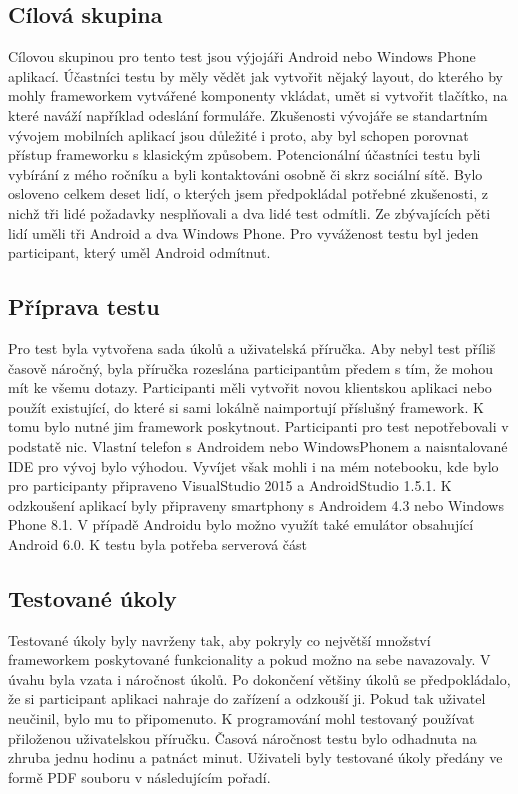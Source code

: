 \subsection{Cílová skupina}
Cílovou skupinou pro tento test jsou výjojáři Android nebo Windows Phone aplikací. Účastníci testu by měly vědět jak vytvořit nějaký layout, do kterého by mohly frameworkem vytvářené komponenty vkládat, umět si vytvořit tlačítko, na které naváží například odeslání formuláře. Zkušenosti vývojáře se standartním vývojem mobilních aplikací jsou důležité i proto, aby byl schopen porovnat přístup frameworku s klasickým způsobem. Potencionální účastníci testu byli vybírání z mého ročníku a byli kontaktováni osobně či skrz sociální sítě. Bylo osloveno celkem deset lidí, o kterých jsem předpokládal potřebné zkušenosti, z nichž tři lidé požadavky nesplňovali a dva lidé test odmítli. Ze zbývajících pěti lidí uměli tři Android a dva Windows Phone. Pro vyváženost testu byl jeden participant, který uměl Android odmítnut.    

\subsection{Příprava testu}
Pro test byla vytvořena sada úkolů a uživatelská příručka. Aby nebyl test příliš časově náročný, byla příručka rozeslána participantům předem s tím, že mohou mít ke všemu dotazy. Participanti měli vytvořit novou klientskou aplikaci nebo použít existující, do které si sami lokálně naimportují příslušný framework. K tomu bylo nutné jim framework poskytnout. Participanti pro test nepotřebovali v podstatě nic. Vlastní telefon s Androidem nebo WindowsPhonem a naisntalované IDE pro vývoj bylo výhodou. Vyvíjet však mohli i na mém notebooku, kde bylo pro participanty připraveno VisualStudio 2015 a AndroidStudio 1.5.1. K odzkoušení aplikací byly připraveny smartphony s Androidem 4.3 nebo Windows Phone 8.1. V případě Androidu bylo možno využít také emulátor obsahující Android 6.0. K testu byla potřeba serverová část
 
\subsection{Testované úkoly}
Testované úkoly byly navrženy tak, aby pokryly co největší množství frameworkem poskytované funkcionality a pokud možno na sebe navazovaly. V úvahu byla vzata i náročnost úkolů. Po dokončení většiny úkolů se předpokládalo, že si participant aplikaci nahraje do zařízení a odzkouší ji. Pokud tak uživatel neučinil, bylo mu to připomenuto. K programování mohl testovaný používat přiloženou uživatelskou příručku. Časová náročnost testu bylo odhadnuta na zhruba jednu hodinu a patnáct minut. Uživateli byly testované úkoly předány ve formě PDF souboru v následujícím pořadí.

